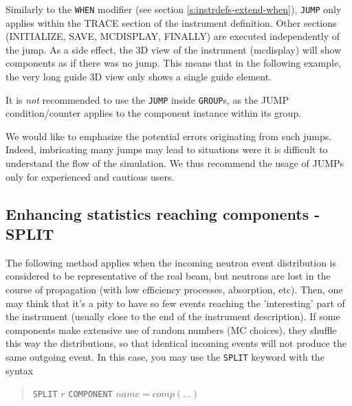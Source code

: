 Similarly to the \texttt{WHEN} modifier (see section
\ref{s:instrdefs-extend-when}), \texttt{JUMP} only applies within the TRACE
section of the instrument definition. Other sections (INITIALIZE, SAVE,
MCDISPLAY, FINALLY) are executed independently of the jump. As a side effect,
the 3D view of the instrument (mcdisplay) will show components as if there was
no jump. This means that in the following example, the very long guide 3D view
only shows a single guide element.

It is \emph{not} recommended to use the \verb+JUMP+ inside \verb+GROUP+s, as the
JUMP condition/counter applies to the component instance within its group.

We would like to emphasize the potential errors originating from such
jumps. Indeed, imbricating many jumps may lead to situations were it is
difficult to understand the flow of the simulation. We thus recommend the usage
of JUMPs only for experienced and cautious users.

\subsection{Enhancing statistics reaching components - SPLIT}
\label{s:instrdefs-extend-enhance}

The following method applies when the incoming neutron event distribution is
considered to be representative of the real beam, but neutrons are lost in the
course of propagation (with low efficiency processes, absorption, etc). Then,
one may think that it's a pity to have so few events reaching the 'interesting'
part of the instrument (usually close to the end of the instrument description).
If some components make extensive use of random numbers (MC choices), they
shuffle this way the distributions, so that identical incoming events will not
produce the same outgoing event. In this case, you may use the \verb+SPLIT+
keyword with the syntax

\begin{quote}
  \texttt{SPLIT} ${r}$ \texttt{COMPONENT} $\textit{name} = \textit{comp}(\ldots)$
\end{quote}

